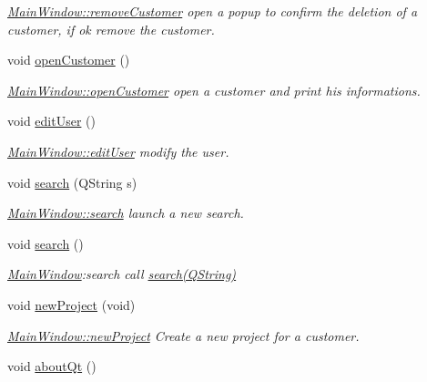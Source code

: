 \begin{DoxyCompactItemize}
\begin{DoxyCompactList}\small\item\em \hyperlink{classMainWindow_adb6fcfe64c3a11f28655e397b3accea9}{Main\+Window\+::remove\+Customer} open a popup to confirm the deletion of a customer, if ok remove the customer. \end{DoxyCompactList}\item 
void \hyperlink{classMainWindow_ad2f2a4051df4fc4776ea4465cf6b6ecb}{open\+Customer} ()
\begin{DoxyCompactList}\small\item\em \hyperlink{classMainWindow_ad2f2a4051df4fc4776ea4465cf6b6ecb}{Main\+Window\+::open\+Customer} open a customer and print his informations. \end{DoxyCompactList}\item 
void \hyperlink{classMainWindow_a32fb574dece506733a3b80d2ccf565ac}{edit\+User} ()
\begin{DoxyCompactList}\small\item\em \hyperlink{classMainWindow_a32fb574dece506733a3b80d2ccf565ac}{Main\+Window\+::edit\+User} modify the user. \end{DoxyCompactList}\item 
void \hyperlink{classMainWindow_a62fcad69e9d32b98f3ac40a5a1d0f398}{search} (Q\+String s)
\begin{DoxyCompactList}\small\item\em \hyperlink{classMainWindow_a62fcad69e9d32b98f3ac40a5a1d0f398}{Main\+Window\+::search} launch a new search. \end{DoxyCompactList}\item 
\hypertarget{classMainWindow_a274dd0e068ebdc2a752e7ef05209fb2d}{void \hyperlink{classMainWindow_a274dd0e068ebdc2a752e7ef05209fb2d}{search} ()}\label{classMainWindow_a274dd0e068ebdc2a752e7ef05209fb2d}

\begin{DoxyCompactList}\small\item\em \hyperlink{classMainWindow}{Main\+Window}\+:search call \hyperlink{classMainWindow_a62fcad69e9d32b98f3ac40a5a1d0f398}{search(\+Q\+String)} \end{DoxyCompactList}\item 
void \hyperlink{classMainWindow_a31a63c4615f9c26a6df6e8c3b52967a1}{new\+Project} (void)
\begin{DoxyCompactList}\small\item\em \hyperlink{classMainWindow_a31a63c4615f9c26a6df6e8c3b52967a1}{Main\+Window\+::new\+Project} Create a new project for a customer. \end{DoxyCompactList}\item 
\hypertarget{classMainWindow_a4710d90108bd39f7b80bdc6c3a1b1aef}{void \hyperlink{classMainWindow_a4710d90108bd39f7b80bdc6c3a1b1aef}{about\+Qt} ()}\label{classMainWindow_a4710d90108bd39f7b80bdc6c3a1b1aef}


\end{DoxyCompactItemize}
